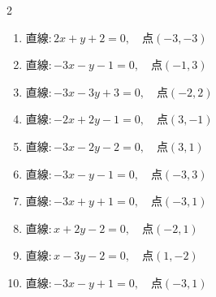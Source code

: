 


\setcounter{quesnum}{20}

\begin{multicols}{2}
\begin{enumerate}
  \itemsep=30pt
  \item $直線:2x+y+2=0,\quad 点 ( -3, -3 )$


  \item $直線:-3x-y-1=0,\quad 点 ( -1, 3 )$


  \item $直線:-3x-3y+3=0,\quad 点 ( -2, 2 )$


  \item $直線:-2x+2y-1=0,\quad 点 ( 3, -1 )$


  \item $直線:-3x-2y-2=0,\quad 点 ( 3, 1 )$


  \item $直線:-3x-y-1=0,\quad 点 ( -3, 3 )$


  \item $直線:-3x+y+1=0,\quad 点 ( -3, 1 )$


  \item $直線:x+2y-2=0,\quad 点 ( -2, 1 )$


  \item $直線:x-3y-2=0,\quad 点 ( 1, -2 )$


  \item $直線:-3x-y+1=0,\quad 点 ( -3, 1 )$


\columnbreak %


\end{enumerate}
\end{multicols}

